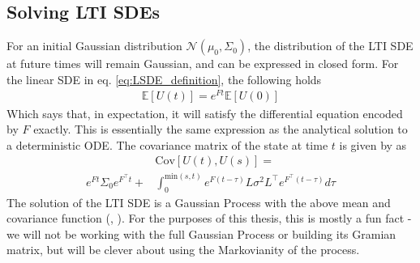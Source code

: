 \subsection*{Solving LTI SDEs}
For an initial Gaussian distribution $\mathcal{N}(\mu_0, \Sigma_0)$, the distribution of the LTI SDE at future times will remain Gaussian, and can be expressed in closed form. For the linear SDE in eq. \ref{eq:LSDE_definition}, the following holds
\begin{align}\label{eq:SDE_mean}
    \mathbb{E}[U(t)] = e^{Ft}\mathbb{E}[U(0)]
\end{align}
Which says that, in expectation, it will satisfy the differential equation encoded by $F$ exactly. This is essentially the same expression as the analytical solution to a deterministic ODE. The covariance matrix of the state at time $t$ is given by \cite{invention_of_ODE_solver} as
\begin{align}\label{eq:SDE_cov}
    &\text{Cov}[U(t), U(s)] = \nonumber \\ e^{Ft}\Sigma_0e^{F^\top t} 
    + &\int_0^{\text{min}(s,t)} e^{F(t-\tau)}L\sigma^2L^\top e^{F^\top(t-\tau)} d\tau
\end{align}
The solution of the LTI SDE is a Gaussian Process with the above mean and covariance function (\cite{probnum}, \cite{gp_Rasmussen}). For the purposes of this thesis, this is mostly a fun fact - we will not be working with the full Gaussian Process or building its Gramian matrix, but will be clever about using the Markovianity of the process.
